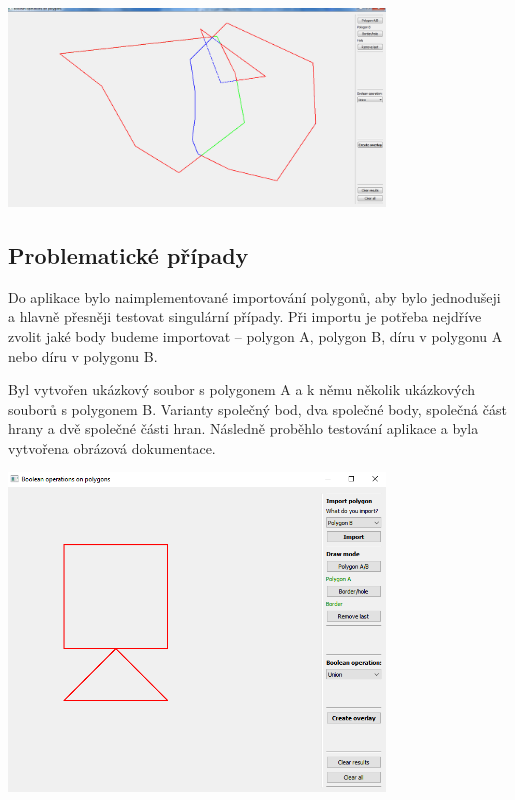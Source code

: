 \documentclass[12pt]{article}
\begin{document}
\begin{center}
   \includegraphics[width=10cm]{./img/aplikacia_diera_Union.png}
\end{center}

\subsection{Problematické případy}
Do aplikace bylo naimplementované importování polygonů, aby bylo jednodušeji a hlavně přesněji testovat singulární případy. Při importu je potřeba nejdříve zvolit jaké body budeme importovat -- polygon A, polygon B, díru v polygonu A nebo díru v polygonu B.

Byl vytvořen ukázkový soubor s polygonem A a k němu několik ukázkových souborů s polygonem B. Varianty společný bod, dva společné body, společná část hrany a dvě společné části hran. Následně proběhlo testování aplikace a byla vytvořena obrázová dokumentace.

\begin{center}
	\includegraphics[width=10cm]{./img/singular_union.png}
\end{center}
\end{document}
